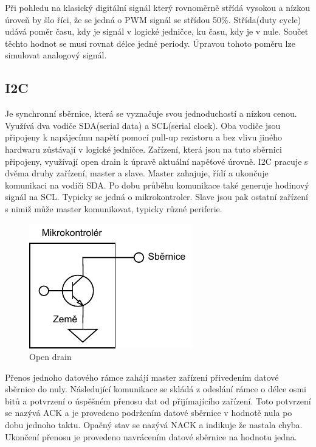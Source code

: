 Při pohledu na klasický digitální signál který rovnoměrně střídá vysokou a nízkou úroveň by šlo říci, že se jedná o PWM signál se střídou 50\%. Střída(duty cycle) udává poměr času, kdy je signál v logické jedničce, ku času, kdy je v nule. Součet těchto hodnot se musí rovnat délce jedné periody. Úpravou tohoto poměru lze simulovat analogový signál. \cite[str:~116-118]{embeded_robotics}

\subsection*{I2C}
Je synchronní sběrnice, která se vyznačuje svou jednoduchostí a nízkou cenou. Využívá dva vodiče SDA(serial data) a SCL(serial clock). Oba vodiče jsou připojeny k napájecímu napětí pomocí pull-up rezistoru a bez vlivu jiného hardwaru zůstávají v logické jedničce. Zařízení, která jsou na tuto sběrnici připojeny, využívají open drain k úpravě aktuální napěťové úrovně. I2C pracuje s dvěma druhy zařízení, master a slave. Master zahajuje, řídí a ukončuje komunikaci na vodiči SDA. Po dobu průběhu komunikace také generuje hodinový signál na SCL. Typicky se jedná o mikrokontroler. Slave jsou pak ostatní zařízení s nimiž může master komunikovat, typicky různé periferie. \cite[str:~88]{embeded_robotics}

\begin{figure}[h!]
	\centering
	\includegraphics[scale=1]{obrazky-figures/open_drain.pdf}
	\caption{Open drain}
	\label{}
\end{figure}

Přenos jednoho datového rámce zahájí master zařízení přivedením datové sběrnice do nuly. Následující komunikace se skládá z odeslání rámce o délce osmi bitů a potvrzení o úspěšném přenosu dat od přijímajícího zařízení. Toto potvrzení se nazývá ACK a je provedeno podržením datové sběrnice v hodnotě nula po dobu jednoho taktu. Opačný stav se nazývá NACK a indikuje že nastala chyba. Ukončení přenosu je provedeno navrácením datové sběrnice na hodnotu jedna. \cite{um10204}


